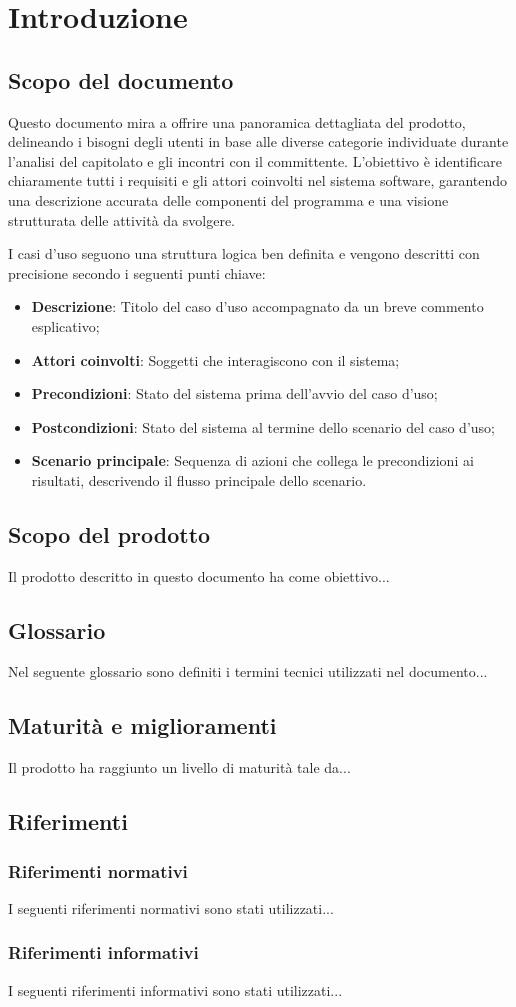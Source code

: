 \section{Introduzione}

\subsection{Scopo del documento}
Questo documento mira a offrire una panoramica dettagliata del prodotto, 
delineando i bisogni degli utenti in base alle diverse categorie individuate durante 
l'analisi del capitolato e gli incontri con il committente.
L'obiettivo è identificare chiaramente tutti i requisiti e gli attori coinvolti
nel sistema software, garantendo una descrizione accurata delle componenti del programma
e una visione strutturata delle attività da svolgere. 

I casi d’uso seguono una struttura logica ben definita e vengono descritti 
con precisione secondo i seguenti punti chiave:

\begin{itemize}
    \item \textbf{Descrizione}: Titolo del caso d’uso accompagnato da un breve commento esplicativo;
    \item \textbf{Attori coinvolti}: Soggetti che interagiscono con il sistema;
    \item \textbf{Precondizioni}: Stato del sistema prima dell’avvio del caso d’uso;
    \item \textbf{Postcondizioni}: Stato del sistema al termine dello scenario del caso d’uso;
    \item \textbf{Scenario principale}: Sequenza di azioni che collega le precondizioni ai risultati, descrivendo il flusso principale dello scenario.
\end{itemize}

\subsection{Scopo del prodotto}
Il prodotto descritto in questo documento ha come obiettivo...

\subsection{Glossario}
Nel seguente glossario sono definiti i termini tecnici utilizzati nel documento...

\subsection{Maturità e miglioramenti}
Il prodotto ha raggiunto un livello di maturità tale da...

\subsection{Riferimenti}

\subsubsection{Riferimenti normativi}
I seguenti riferimenti normativi sono stati utilizzati...

\subsubsection{Riferimenti informativi}
I seguenti riferimenti informativi sono stati utilizzati...
